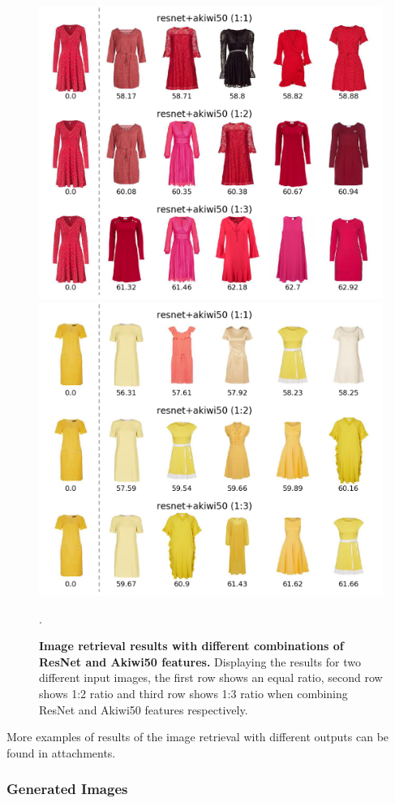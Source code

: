 \documentclass{article}
\begin{document}
\begin{figure}[h]
\centering
{\includegraphics[width=.48\linewidth]{retrieval_exp/resnet_red}}\hspace{0.2cm}
{\includegraphics[width=.48\linewidth]{retrieval_exp/resnet_yellow}}
\caption{\label{fig:search_weights} \textbf{Image retrieval results with different combinations of ResNet and Akiwi50 features.} Displaying the results for two different input images, the first row shows an equal ratio, second row shows 1:2 ratio and third row shows 1:3 ratio when combining ResNet and Akiwi50 features respectively.}.
\end{figure}

More examples of results of the image retrieval with different outputs can be found in attachments.

\subsubsection{Generated Images}
















\newpage


\end{document}
